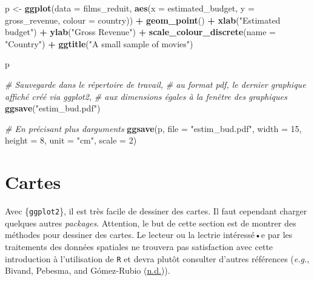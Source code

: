 \documentclass[
  11pt,
]{book}
\newenvironment{Shaded}{\begin{snugshade}}{\end{snugshade}}
\newcommand{\CommentTok}[1]{\textcolor[rgb]{0.56,0.35,0.01}{\textit{#1}}}
\newcommand{\DataTypeTok}[1]{\textcolor[rgb]{0.13,0.29,0.53}{#1}}
\newcommand{\DecValTok}[1]{\textcolor[rgb]{0.00,0.00,0.81}{#1}}
\newcommand{\KeywordTok}[1]{\textcolor[rgb]{0.13,0.29,0.53}{\textbf{#1}}}
\newcommand{\NormalTok}[1]{#1}
\newcommand{\OperatorTok}[1]{\textcolor[rgb]{0.81,0.36,0.00}{\textbf{#1}}}
\newcommand{\StringTok}[1]{\textcolor[rgb]{0.31,0.60,0.02}{#1}}
\numberwithin{equation}{section}
\numberwithin{countremarque}{section}
\begin{document}
\begin{Shaded}
\begin{Highlighting}[]
\NormalTok{p \textless{}{-}}\StringTok{ }\KeywordTok{ggplot}\NormalTok{(}\DataTypeTok{data =}\NormalTok{ films\_reduit, }
            \KeywordTok{aes}\NormalTok{(}\DataTypeTok{x =}\NormalTok{ estimated\_budget,}
                \DataTypeTok{y =}\NormalTok{ gross\_revenue,}
                \DataTypeTok{colour =}\NormalTok{ country)) }\OperatorTok{+}
\StringTok{  }\KeywordTok{geom\_point}\NormalTok{() }\OperatorTok{+}\StringTok{ }\KeywordTok{xlab}\NormalTok{(}\StringTok{"Estimated budget"}\NormalTok{) }\OperatorTok{+}\StringTok{ }\KeywordTok{ylab}\NormalTok{(}\StringTok{"Gross Revenue"}\NormalTok{) }\OperatorTok{+}
\StringTok{  }\KeywordTok{scale\_colour\_discrete}\NormalTok{(}\DataTypeTok{name =} \StringTok{"Country"}\NormalTok{) }\OperatorTok{+}
\StringTok{  }\KeywordTok{ggtitle}\NormalTok{(}\StringTok{"A small sample of movies"}\NormalTok{)}

\NormalTok{p}

\CommentTok{\# Sauvegarde dans le répertoire de travail,}
\CommentTok{\# au format pdf, le dernier graphique affiché créé via ggplot2,}
\CommentTok{\# aux dimensions égales à la fenêtre des graphiques}
\KeywordTok{ggsave}\NormalTok{(}\StringTok{"estim\_bud.pdf"}\NormalTok{)}


\CommentTok{\# En précisant plus d\textquotesingle{}arguments}
\KeywordTok{ggsave}\NormalTok{(p, }
       \DataTypeTok{file =} \StringTok{"estim\_bud.pdf"}\NormalTok{, }\DataTypeTok{width =} \DecValTok{15}\NormalTok{, }\DataTypeTok{height =} \DecValTok{8}\NormalTok{,}
       \DataTypeTok{unit =} \StringTok{"cm"}\NormalTok{, }\DataTypeTok{scale =} \DecValTok{2}\NormalTok{)}
\end{Highlighting}
\end{Shaded}

\hypertarget{graphiques_maps}{%
\section{Cartes}\label{graphiques_maps}}

Avec \{\texttt{ggplot2}\}, il est très facile de dessiner des cartes. Il faut cependant charger quelques autres \emph{packages}. Attention, le but de cette section est de montrer des méthodes pour dessiner des cartes. Le lecteur ou la lectrie intéressé•e par les traitements des données spatiales ne trouvera pas satisfaction avec cette introduction à l'utilisation de \texttt{R} et devra plutôt consulter d'autres références (\emph{e.g.}, Bivand, Pebesma, and Gómez-Rubio (\protect\hyperlink{ref-Bivand_2008_Applied}{n.d.})).
\end{document}
